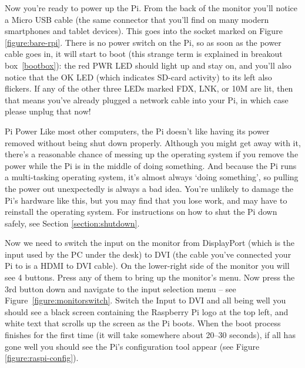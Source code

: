 Now you're ready to power up the Pi. From the back of the monitor you'll notice a Micro USB cable (the same connector that you'll find on many modern smartphones and tablet devices). This goes into the socket marked  on Figure \ref{figure:bare-rpi}. There is no power switch on the Pi, so as soon as the power cable goes in, it will start to boot (this strange term is explained in breakout box~\ref{bootbox}): the red PWR LED should light up and stay on, and you'll also notice that the OK LED (which indicates SD-card activity) to its left also flickers. If any of the other three LEDs marked FDX, LNK, or 10M are lit, then that means you've already plugged a network cable into your Pi, in which case please unplug that now!

\begin{danger}{Pi Power} 
Like most other computers, the Pi doesn't like having its power removed without being shut down properly. Although you might get away with it, there's a reasonable chance of messing up the operating system if you remove the power while the Pi is in the middle of doing something. And because the Pi runs a multi-tasking operating system, it's almost always `doing something', so pulling the power out unexpectedly is always a bad idea. You're unlikely to damage the Pi's hardware like this, but you may find that you lose work, and may have to reinstall the operating system. For instructions on how to shut the Pi down safely, see Section \ref{section:shutdown}.
\end{danger}

Now we need to switch the input on the monitor from DisplayPort (which
is the input used by the PC under the desk) to DVI (the cable you've
connected your Pi to is a HDMI to DVI cable). On the lower-right side
of the monitor you will see 4 buttons. Press any of them to bring up
the monitor's menu. Now press the 3rd button down and navigate to the
input selection menu -- see Figure~\ref{figure:monitorswitch}. Switch
the Input to DVI and all being well you should see a black screen
containing the Raspberry Pi logo at the top left, and white text that
scrolls up the screen as the Pi boots. When the boot process finishes
for the first time (it will take somewhere about 20--30 seconds), if
all has gone well you should see the Pi's configuration tool appear
(see Figure \ref{figure:raspi-config}).

